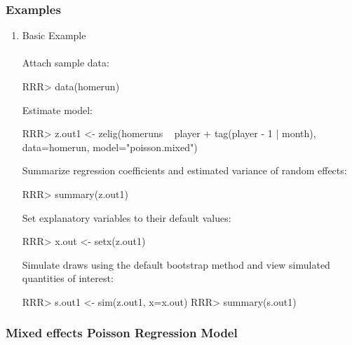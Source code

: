 \subsubsection{Examples}

\begin{enumerate}
\item Basic Example \\
\\
Attach sample data: \\
\begin{Schunk}
\begin{Sinput}
RRR> data(homerun)
\end{Sinput}
\end{Schunk}
Estimate model:
\begin{Schunk}
\begin{Sinput}
RRR> z.out1 <- zelig(homeruns ~ player + tag(player - 1 | month), data=homerun, model="poisson.mixed")
\end{Sinput}
\end{Schunk}

\noindent Summarize regression coefficients and estimated variance of random effects:\\
\begin{Schunk}
\begin{Sinput}
RRR> summary(z.out1)
\end{Sinput}
\end{Schunk}
Set explanatory variables to their default values:\\
\begin{Schunk}
\begin{Sinput}
RRR> x.out <- setx(z.out1)
\end{Sinput}
\end{Schunk}
Simulate draws using the default bootstrap method and view simulated quantities of interest: \\
\begin{Schunk}
\begin{Sinput}
RRR> s.out1 <- sim(z.out1, x=x.out)
RRR> summary(s.out1)
\end{Sinput}
\end{Schunk}

\end{enumerate}


\subsubsection{Mixed effects Poisson Regression Model}

